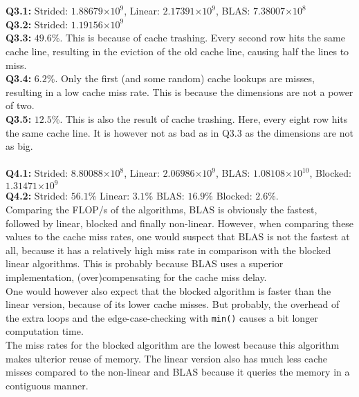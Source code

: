 \documentclass[10pt,a4paper]{article}
\providecommand{\e}[1]{\ensuremath{\times 10^{#1}}}
\begin{document}
\\
\\
\textbf{Q3.1:} Strided: $1.88679\e{9}$, Linear: $2.17391\e{9}$, BLAS: $7.38007\e{8}$
\\
\textbf{Q3.2:} Strided: $1.19156\e{9}$
\\
\textbf{Q3.3:} $49.6$\%. This is because of cache trashing. Every second row hits the same cache line, resulting in the eviction of the old cache line, causing half the lines to miss. 
\\
\textbf{Q3.4:} $6.2$\%. Only the first (and some random) cache lookups are misses, resulting in a low cache miss rate. This is because the dimensions are not a power of two. 
\\
\textbf{Q3.5:} $12.5$\%. This is also the result of cache trashing. Here, every eight row hits the same cache line. It is however not as bad as in Q3.3 as the dimensions are not as big.
\\
\\
\textbf{Q4.1:}
Strided: $8.80088\e{8}$,
Linear: $2.06986\e{9}$,
BLAS: $1.08108\e{10}$,
Blocked: $1.31471\e{9}$
\\
\textbf{Q4.2:}
Strided: $56.1$\%
Linear: $3.1$\%
BLAS: $16.9$\%
Blocked: $2.6$\%. \\
Comparing the FLOP/s of the algorithms, BLAS is obviously the fastest, followed by linear, blocked and finally non-linear. However, when comparing these values to the cache miss rates, one would suspect that BLAS is not the fastest at all, because it has a relatively high miss rate in comparison with the blocked linear algorithms. This is probably because BLAS uses a superior implementation, (over)compensating for the cache miss delay. \\
One would however also expect that the blocked algorithm is faster than the linear version, because of its lower cache misses. But probably, the overhead of the extra loops and the edge-case-checking with \texttt{min()} causes a bit longer computation time. \\
The miss rates for the blocked algorithm are the lowest because this algorithm makes ulterior reuse of memory. The linear version also has much less cache misses compared to the non-linear and BLAS because it queries the memory in a contiguous manner.
\end{document}
